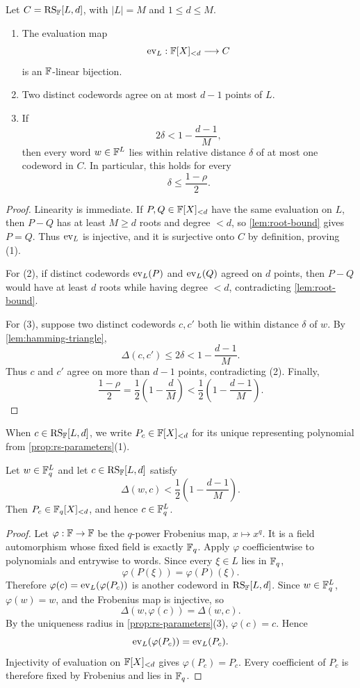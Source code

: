 \begin{proposition}
\label{prop:rs-parameters}
Let $C=\operatorname{RS}_{\mathbb{F}}[L,d]$, with $|L|=M$ and $1\le d\le M$.
\begin{enumerate}[label=(\arabic*),leftmargin=*]
  \item The evaluation map
  \[
    \operatorname{ev}_L:\mathbb{F}[X]_{<d}\longrightarrow C
  \]
  is an $\mathbb{F}$-linear bijection.
  \item Two distinct codewords agree on at most $d-1$ points of $L$.
  \item If
  \[
    2\delta<1-\frac{d-1}{M},
  \]
  then every word $w\in\mathbb{F}^L$ lies within relative distance $\delta$ of at most one codeword in $C$.  In particular, this holds for every
  \[
    \delta\le\frac{1-\rho}{2}.
  \]
\end{enumerate}
\end{proposition}

\begin{proof}
Linearity is immediate.  If $P,Q\in\mathbb{F}[X]_{<d}$ have the same evaluation on $L$, then $P-Q$ has at least $M\ge d$ roots and degree $<d$, so \cref{lem:root-bound} gives $P=Q$.  Thus $\operatorname{ev}_L$ is injective, and it is surjective onto $C$ by definition, proving (1).

For (2), if distinct codewords $\operatorname{ev}_L(P)$ and $\operatorname{ev}_L(Q)$ agreed on $d$ points, then $P-Q$ would have at least $d$ roots while having degree $<d$, contradicting \cref{lem:root-bound}.

For (3), suppose two distinct codewords $c,c'$ both lie within distance $\delta$ of $w$.  By \cref{lem:hamming-triangle},
\[
  \Delta(c,c')\le2\delta<1-\frac{d-1}{M}.
\]
Thus $c$ and $c'$ agree on more than $d-1$ points, contradicting (2).  Finally,
\[
  \frac{1-\rho}{2}
  =\frac12\left(1-\frac dM\right)
  <\frac12\left(1-\frac{d-1}{M}\right).
\]
\end{proof}

When $c\in\operatorname{RS}_{\mathbb{F}}[L,d]$, we write $P_c\in\mathbb{F}[X]_{<d}$ for its unique representing polynomial from \cref{prop:rs-parameters}(1).

\begin{lemma}
\label{lem:basefield-decoding}
Let $w\in\mathbb{F}_q^L$ and let $c\in\operatorname{RS}_{\mathbb{F}}[L,d]$ satisfy
\[
  \Delta(w,c)<\frac12\left(1-\frac{d-1}{M}\right).
\]
Then $P_c\in\mathbb{F}_q[X]_{<d}$, and hence $c\in\mathbb{F}_q^L$.
\end{lemma}

\begin{proof}
Let $\varphi:\mathbb{F}\to\mathbb{F}$ be the $q$-power Frobenius map, $x\mapsto x^q$.  It is a field automorphism whose fixed field is exactly $\mathbb{F}_q$.  Apply $\varphi$ coefficientwise to polynomials and entrywise to words.  Since every $\xi\in L$ lies in $\mathbb{F}_q$,
\[
  \varphi(P(\xi))=\varphi(P)(\xi).
\]
Therefore $\varphi(c)=\operatorname{ev}_L(\varphi(P_c))$ is another codeword in $\operatorname{RS}_{\mathbb{F}}[L,d]$.  Since $w\in\mathbb{F}_q^L$, $\varphi(w)=w$, and the Frobenius map is injective, so
\[
  \Delta(w,\varphi(c))=\Delta(w,c).
\]
By the uniqueness radius in \cref{prop:rs-parameters}(3), $\varphi(c)=c$.  Hence
\[
  \operatorname{ev}_L(\varphi(P_c))=\operatorname{ev}_L(P_c).
\]
Injectivity of evaluation on $\mathbb{F}[X]_{<d}$ gives $\varphi(P_c)=P_c$.  Every coefficient of $P_c$ is therefore fixed by Frobenius and lies in $\mathbb{F}_q$.
\end{proof}

